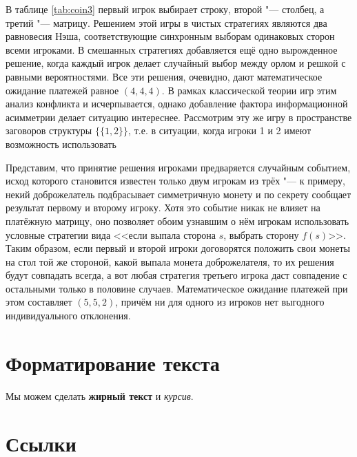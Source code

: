 В таблице \ref{tab:coin3} первый игрок выбирает строку, второй "--- столбец, а третий "--- матрицу. Решением этой игры в чистых стратегиях являются два равновесия Нэша, соответствующие синхронным выборам одинаковых сторон всеми игроками. В смешанных стратегиях добавляется ещё одно вырожденное решение, когда каждый игрок делает случайный выбор между орлом и решкой с равными вероятностями. Все эти решения, очевидно, дают математическое ожидание платежей равное $(4,4,4)$. В рамках классической теории игр этим анализ конфликта и исчерпывается, однако добавление фактора информационной асимметрии делает ситуацию интереснее. Рассмотрим эту же игру в пространстве заговоров структуры $\{\{1,2\}\}$, т.е. в ситуации, когда игроки 1 и 2 имеют возможность использовать 

Представим, что принятие решения игроками предваряется случайным событием, исход которого становится известен только двум игрокам из трёх "--- к примеру, некий доброжелатель подбрасывает симметричную монету и по секрету сообщает результат первому и второму игроку. Хотя это событие никак не влияет на платёжную матрицу, оно позволяет обоим узнавшим о нём игрокам использовать условные стратегии вида <<если выпала сторона $s$, выбрать сторону $f(s)$>>. Таким образом, если первый и второй игроки договорятся положить свои монеты на стол той же стороной, какой выпала монета доброжелателя, то их решения будут совпадать всегда, а вот любая стратегия третьего игрока даст совпадение с остальными только в половине случаев. Математическое ожидание платежей при этом составляет $(5,5,2)$, причём ни для одного из игроков нет выгодного индивидуального отклонения.


\section{Форматирование текста}

Мы можем сделать \textbf{жирный текст} и \textit{курсив}.

\section{Ссылки}

